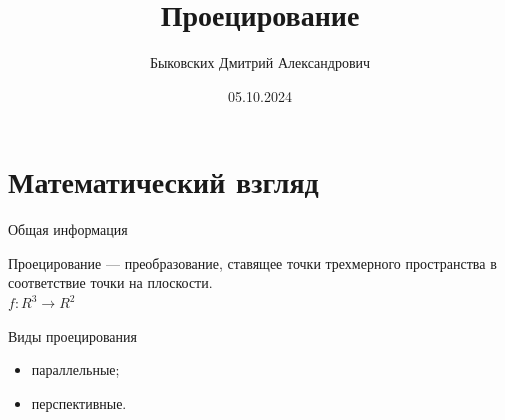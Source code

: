 \documentclass{beamer}
\title[Проецирование]{Проецирование}
\author[Быковских Д.А.]{Быковских Дмитрий Александрович}
\date{05.10.2024}
\begin{document}
	\begin{frame}
		\titlepage
	\end{frame}

	\section{Математический взгляд}

	\begin{frame}{Общая информация}
		
		Проецирование --- преобразование, ставящее точки трехмерного пространства 
		в соответствие точки на плоскости. \\
		$f: R^3 \to R^2$
		
		Виды проецирования
		\begin{itemize}
			\item параллельные;
			\item перспективные.
		\end{itemize}

	\end{frame}
\end{document}
